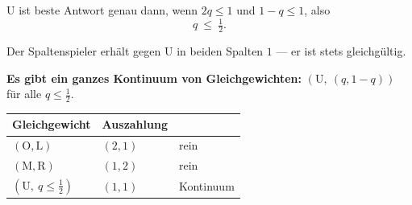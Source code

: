 \begin{aufgabe}
U ist beste Antwort genau dann, wenn $2q \le 1$ und $1-q \le 1$, also
\[ q \ \le\ \tfrac12 . \]

Der Spaltenspieler erhält gegen U in beiden Spalten $1$ --- er ist stets gleichgültig. \checkmark

\begin{center}
\begin{minipage}{0.9\textwidth}
\textbf{Es gibt ein ganzes Kontinuum von Gleichgewichten:} $(\text{U},\ (q,1-q))$ für alle $q \le \tfrac12$.
\end{minipage}
\end{center}

\begin{center}
{\small
\renewcommand{\arraystretch}{1.5}
\begin{tabular}{@{}P{3.2cm}P{2.0cm}P{2.2cm}@{}}
\toprule
\textbf{Gleichgewicht} & \textbf{Aus\-zahlung} & \\
\midrule
$(\text{O},\text{L})$ & $(2,1)$ & rein\\
$(\text{M},\text{R})$ & $(1,2)$ & rein\\
$(\text{U},\ q\le\tfrac12)$ & $(1,1)$ & \textcolor{akzent}{Kontinuum}\\
\bottomrule
\end{tabular}}
\end{center}

\begin{center}
\begin{minipage}{0.88\textwidth}
\end{minipage}
\end{center}
\end{aufgabe}

